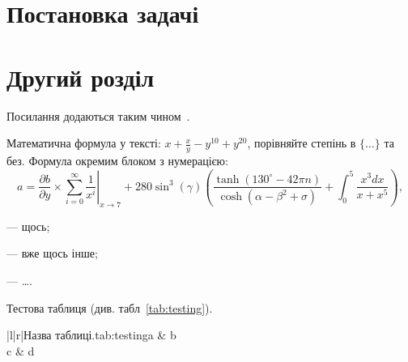 \documentclass{pma-bthesis}
\begin{document}
\tableofcontents

\intro

\chapter{Постановка задачі}

\chapter{Другий розділ}
Посилання додаються таким чином~\cite{Aho1992,Laming1968,NML}.

Математична формула у тексті: $x+\frac{x}{y} - y^{10} + y^20$, порівняйте степінь в $\{\dots\}$ та без. Формула окремим блоком з нумерацією:
\begin{equation}
    a = \frac{\partial b}{\partial{} y}\times\left.\sum_{i=0}^{\infty}\frac{1}{x^i}\right| _{x\rightarrow7} + 280\sin^3(\gamma)\left(\frac{\tanh(130^\circ - 42\pi n)}{\cosh(\alpha - \beta^2 + \sigma)}+\int_0^5 \frac{x^3 dx}{x + x^5} \right),
\end{equation}
\begin{eqdesc}
    \item[$a$] --- щось;
    \item[$b$] --- вже щось інше;
    \item[\dots] --- \dots.
\end{eqdesc}

Тестова таблиця (див. табл~\ref{tab:testing}).
\begin{table}{|l|r|}{Назва таблиці.}{tab:testing}{\hline a & b\\\hline}
    c & d
\end{table}
\end{document}
